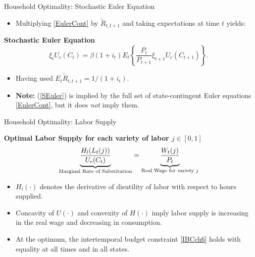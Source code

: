 \documentclass[11pt,aspectratio=169]{beamer}
\begin{document}
\begin{frame}[label=StochasticEuler]{Household Optimality: Stochastic Euler Equation}
\small

\begin{itemize}
  \item Multiplying \eqref{EulerCont} by $\tilde{R}_{t,t+1}$ and taking expectations at time $t$ yields:
\end{itemize}
\vspace{0.3cm}
\textbf{Stochastic Euler Equation}
\begin{equation}
\xi_t U_c(C_t)
=
\beta (1+i_t) E_t\left\{\frac{P_t}{P_{t+1}} \xi_{t+1} U_c(C_{t+1}) \right\}.
\label{SEuler}
\end{equation}

\vspace{0.2cm}
\begin{itemize}
  \item Having used $E_t \tilde{R}_{t,t+1} = 1/(1+i_t)$.
  \item \textbf{Note:} (\ref{SEuler}) is implied by the full set of state-contingent Euler equations \eqref{EulerCont}, but it does \emph{not} imply them.
\end{itemize}

\end{frame}

\begin{frame}[label=LaborSupply]{Household Optimality: Labor Supply}
\small

\textbf{Optimal Labor Supply for each variety of labor $j\in[0,1]$}
\vspace{0.3cm}
\begin{equation}
\underbrace{\frac{H_{l}(L_{t}(j))}{U_{c}(C_{t})}}_{\text{\scriptsize Marginal Rate of Substitution}}
=
\underbrace{\frac{W_t(j)}{P_t}}_{\text{\scriptsize Real Wage for variety $j$}}
\label{LaborSupply}
\end{equation}

\vspace{0.25cm}
\begin{itemize}
  \item $H_l(\cdot)$ denotes the derivative of disutility of labor with respect to hours supplied.
  \item Concavity of $U(\cdot)$ and convexity of $H(\cdot)$ imply labor supply is increasing in the real wage and decreasing in consumption.
  \item At the optimum, the intertemporal budget constraint \eqref{IBCch6} holds with equality at all times and in all states.
\end{itemize}

\end{frame}
\end{document}
